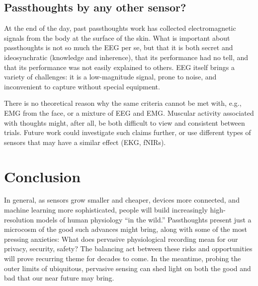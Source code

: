 \documentclass[sigconf]{acmart}
\begin{document}
\subsection{Passthoughts by any other sensor?}
\label{sec:orga592874}

At the end of the day, past passthoughts work has collected electromagnetic signals from the body at the surface of the skin.
What is important about passthoughts is not so much the EEG per se, but that it is both secret and ideosynchratic (knowledge and inherence), that its performance had no tell, and that its performance was not easily explained to others.
EEG itself brings a variety of challenges: it is a low-magnitude signal, prone to noise, and inconvenient to capture without special equipment.

There is no theoretical reason why the same criteria cannot be met with, e.g., EMG from the face, or a mixture of EEG and EMG.
Muscular activity associated with thoughts might, after all, be both difficult to view and consistent between trials.
Future work could investigate such claims further, or use different types of sensors that may have a similar effect (EKG, fNIRs).

\section{Conclusion}
\label{sec:org4c1c71c}

In general, as sensors grow smaller and cheaper, devices more connected, and machine learning more sophisticated, 
people will build increasingly high-resolution models of human physiology ``in the wild.''
Passthoughts present just a microcosm of the good such advances might bring, 
along with some of the most pressing anxieties: 
What does pervasive physiological recording mean for our privacy, security, safety? 
The balancing act between these risks and opportunities will prove recurring theme for decades to come.
In the meantime, probing the outer limits of ubiquitous, pervasive sensing can shed light on both the good and bad that our near future may bring.


\end{document}
